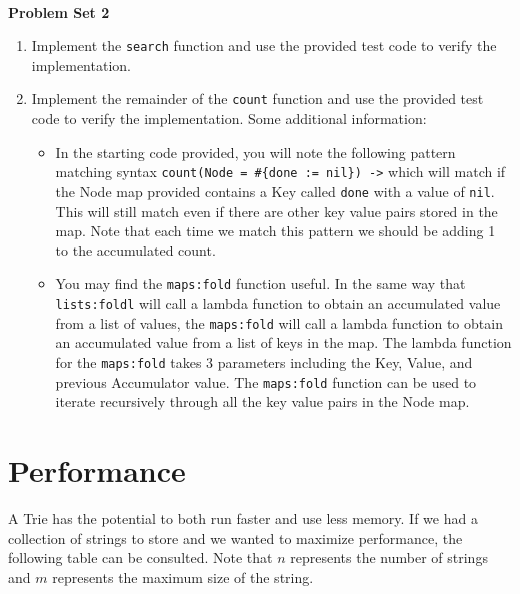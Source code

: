 \documentclass[
]{book}
\providecommand{\tightlist}{%
  \setlength{\itemsep}{0pt}\setlength{\parskip}{0pt}}
\begin{document}
\(\nonumber\)

\begin{problembox}

\textbf{Problem Set 2}

\begin{enumerate}
\def\labelenumi{\arabic{enumi}.}
\tightlist
\item
  Implement the \texttt{search} function and use the provided test code to verify the implementation.
\item
  Implement the remainder of the \texttt{count} function and use the provided test code to verify the implementation. Some additional information:

  \begin{itemize}
  \tightlist
  \item
    In the starting code provided, you will note the following pattern matching syntax \texttt{count(Node\ =\ \#\{done\ :=\ nil\})\ -\textgreater{}} which will match if the Node map provided contains a Key called \texttt{done} with a value of \texttt{nil}. This will still match even if there are other key value pairs stored in the map. Note that each time we match this pattern we should be adding 1 to the accumulated count.
  \item
    You may find the \texttt{maps:fold} function useful. In the same way that \texttt{lists:foldl} will call a lambda function to obtain an accumulated value from a list of values, the \texttt{maps:fold} will call a lambda function to obtain an accumulated value from a list of keys in the map. The lambda function for the \texttt{maps:fold} takes 3 parameters including the Key, Value, and previous Accumulator value. The \texttt{maps:fold} function can be used to iterate recursively through all the key value pairs in the Node map.
  \end{itemize}
\end{enumerate}

\end{problembox}

\hypertarget{performance-2}{%
\section{Performance}\label{performance-2}}

A Trie has the potential to both run faster and use less memory. If we had a collection of strings to store and we wanted to maximize performance, the following table can be consulted. Note that \(n\) represents the number of strings and \(m\) represents the maximum size of the string.
\end{document}
